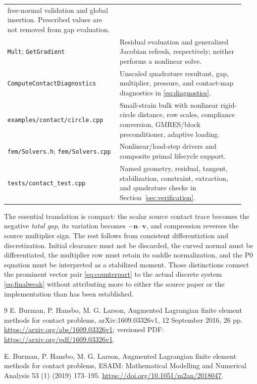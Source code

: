\documentclass[preprint,11pt]{elsarticle}
\numberwithin{equation}{section}
\newcommand{\bv}{\boldsymbol{v}}
\newcommand{\bn}{\boldsymbol{n}}
\newcommand{\code}[1]{\texttt{\nolinkurl{#1}}}
\begin{document}
\begin{table}[!ht]
\begin{tabular}{@{}p{0.45\linewidth}p{0.50\linewidth}@{}}
 free-normal validation and global insertion. Prescribed values are not
 removed from gap evaluation.\\[4pt]
\code{Mult}; \code{GetGradient}
 & Residual evaluation and generalized Jacobian refresh, respectively;
 neither performs a nonlinear solve.\\[4pt]
\code{ComputeContactDiagnostics}
 & Unscaled quadrature resultant, gap, multiplier, pressure, and
 contact-map diagnostics in \eqref{eq:diagnostics}.\\[4pt]
\code{examples/contact/circle.cpp}
 & Small-strain bulk with nonlinear rigid-circle distance, row scales,
 compliance conversion, GMRES/block preconditioner, adaptive loading.\\[4pt]
\code{fem/Solvers.h}; \code{fem/Solvers.cpp}
 & Nonlinear/load-step drivers and composite primal lifecycle support.\\[4pt]
\code{tests/contact_test.cpp}
 & Named geometry, residual, tangent, stabilization, constraint,
 extraction, and quadrature checks in Section~\ref{sec:verification}.\\
\bottomrule
\end{tabular}
\end{table}
\FloatBarrier

The essential translation is compact: the scalar source contact trace
becomes the negative \emph{total gap}, its variation becomes
$-\bn\cdot\bv$, and compression reverses the source multiplier sign.
The rest follows from consistent differentiation and discretization.
Initial clearance must not be discarded, the curved normal must be
differentiated, the multiplier row must retain its saddle normalization,
and the P0 equation must be interpreted as a stabilized moment.
Those distinctions connect the prominent vector pair
\eqref{eq:counterpart} to the actual discrete system
\eqref{eq:finalweak} without attributing more to either the source paper
or the implementation than has been established.

\begingroup
\small
\begin{thebibliography}{9}
E. Burman, P. Hansbo, M. G. Larson,
Augmented Lagrangian finite element methods for contact problems,
arXiv:1609.03326v1, 12 September 2016, 26 pp.
\url{https://arxiv.org/abs/1609.03326v1};
versioned PDF: \url{https://arxiv.org/pdf/1609.03326v1}.

E. Burman, P. Hansbo, M. G. Larson,
Augmented Lagrangian finite element methods for contact problems,
ESAIM: Mathematical Modelling and Numerical Analysis 53 (1) (2019)
173--195.
\url{https://doi.org/10.1051/m2an/2018047}.
\end{thebibliography}
\endgroup
\end{document}

